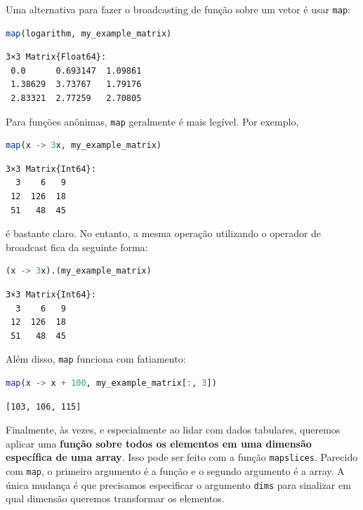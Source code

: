 \documentclass[
  notoc %
]{tufte-book}
\newcommand{\passthrough}[1]{#1}
\begin{document}
Uma alternativa para fazer o broadcasting de função sobre um vetor é
usar \passthrough{\lstinline!map!}:

\begin{lstlisting}[language=Julia]
map(logarithm, my_example_matrix)
\end{lstlisting}

\begin{lstlisting}[language=Output]
3×3 Matrix{Float64}:
 0.0      0.693147  1.09861
 1.38629  3.73767   1.79176
 2.83321  2.77259   2.70805
\end{lstlisting}

Para funções anônimas, \passthrough{\lstinline!map!} geralmente é mais
legível. Por exemplo,

\begin{lstlisting}[language=Julia]
map(x -> 3x, my_example_matrix)
\end{lstlisting}

\begin{lstlisting}[language=Output]
3×3 Matrix{Int64}:
  3    6   9
 12  126  18
 51   48  45
\end{lstlisting}

é bastante claro. No entanto, a mesma operação utilizando o operador de
broadcast fica da seguinte forma:

\begin{lstlisting}[language=Julia]
(x -> 3x).(my_example_matrix)
\end{lstlisting}

\begin{lstlisting}[language=Output]
3×3 Matrix{Int64}:
  3    6   9
 12  126  18
 51   48  45
\end{lstlisting}

Além disso, \passthrough{\lstinline!map!} funciona com fatiamento:

\begin{lstlisting}[language=Julia]
map(x -> x + 100, my_example_matrix[:, 3])
\end{lstlisting}

\begin{lstlisting}[language=Output]
[103, 106, 115]
\end{lstlisting}

Finalmente, às vezes, e especialmente ao lidar com dados tabulares,
queremos aplicar uma \textbf{função sobre todos os elementos em uma
dimensão específica de uma array}. Isso pode ser feito com a função
\passthrough{\lstinline!mapslices!}. Parecido com
\passthrough{\lstinline!map!}, o primeiro argumento é a função e o
segundo argumento é a array. A única mudança é que precisamos
especificar o argumento \passthrough{\lstinline!dims!} para sinalizar em
qual dimensão queremos transformar os elementos.
\end{document}
